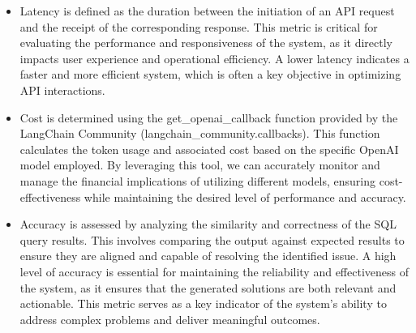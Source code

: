     \begin{itemize}
        \item Latency is defined as the duration between the initiation of an API request and the receipt of the corresponding response. This metric is critical for evaluating the performance and responsiveness of the system, as it directly impacts user experience and operational efficiency. A lower latency indicates a faster and more efficient system, which is often a key objective in optimizing API interactions.
        \item Cost is determined using the get\_openai\_callback function provided by the LangChain Community (langchain\_community.callbacks). This function calculates the token usage and associated cost based on the specific OpenAI model employed. By leveraging this tool, we can accurately monitor and manage the financial implications of utilizing different models, ensuring cost-effectiveness while maintaining the desired level of performance and accuracy.
        \item Accuracy is assessed by analyzing the similarity and correctness of the SQL query results. This involves comparing the output against expected results to ensure they are aligned and capable of resolving the identified issue. A high level of accuracy is essential for maintaining the reliability and effectiveness of the system, as it ensures that the generated solutions are both relevant and actionable. This metric serves as a key indicator of the system's ability to address complex problems and deliver meaningful outcomes.
    \end{itemize}
\pagebreak